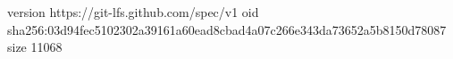 version https://git-lfs.github.com/spec/v1
oid sha256:03d94fec5102302a39161a60ead8cbad4a07c266e343da73652a5b8150d78087
size 11068
